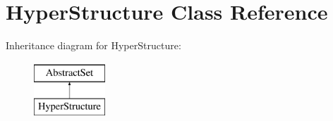 \hypertarget{classHyperStructure}{\section{Hyper\-Structure Class Reference}
\label{classHyperStructure}
}
Inheritance diagram for Hyper\-Structure\-:\begin{figure}[H]
\begin{center}
\leavevmode
\includegraphics[height=2.000000cm]{classHyperStructure}
\end{center}
\end{figure}
